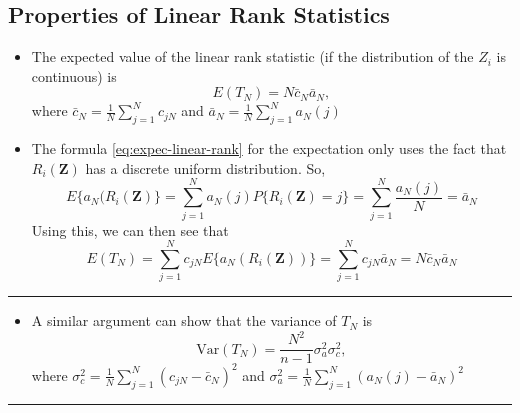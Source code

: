 \documentclass[]{book}
\providecommand{\tightlist}{%
  \setlength{\itemsep}{0pt}\setlength{\parskip}{0pt}}
\begin{document}
\hypertarget{properties-of-linear-rank-statistics}{%
\subsection{Properties of Linear Rank Statistics}\label{properties-of-linear-rank-statistics}}

\begin{itemize}
\item
  The expected value of the linear rank statistic (if the distribution of the \(Z_{i}\) is continuous)
  is
  \begin{equation}
  E(T_{N}) = N\bar{c}_{N}\bar{a}_{N},
  \label{eq:expec-linear-rank}
  \end{equation}
  where \(\bar{c}_{N} = \frac{1}{N} \sum_{j=1}^{N} c_{jN}\) and \(\bar{a}_{N} = \frac{1}{N}\sum_{j=1}^{N} a_{N}(j)\)
\item
  The formula \eqref{eq:expec-linear-rank} for the expectation only uses the fact that \(R_{i}(\mathbf{Z})\) has a discrete uniform
  distribution. So,
  \begin{equation}
  E\{ a_{N}( R_{i}(\mathbf{Z} ) \}
  = \sum_{j=1}^{N} a_{N}(j)P\{ R_{i}( \mathbf{Z}) = j \}
  = \sum_{j=1}^{N} \frac{ a_{N}(j) }{N}
  = \bar{a}_{N}
  \end{equation}
  Using this, we can then see that
  \begin{equation}
  E( T_{N} ) = \sum_{j=1}^{N} c_{jN} E\{ a_{N}(R_{i}(\mathbf{Z})) \}
  = \sum_{j=1}^{N} c_{jN}\bar{a}_{N} = N\bar{c}_{N}\bar{a}_{N}
  \end{equation}
\end{itemize}

\begin{center}\rule{0.5\linewidth}{\linethickness}\end{center}

\begin{itemize}
\tightlist
\item
  A similar argument can show that the variance of \(T_{N}\) is
  \begin{equation}
  \textrm{Var}( T_{N} ) = \frac{N^{2}}{n-1} \sigma_{a}^{2}\sigma_{c}^{2},
  \end{equation}
  where \(\sigma_{c}^{2} = \frac{1}{N}\sum_{j=1}^{N} (c_{jN} - \bar{c}_{N})^{2}\)
  and \(\sigma_{a}^{2} = \frac{1}{N}\sum_{j=1}^{N} (a_{N}(j) - \bar{a}_{N})^{2}\)
\end{itemize}

\begin{center}\rule{0.5\linewidth}{\linethickness}\end{center}
\end{document}
